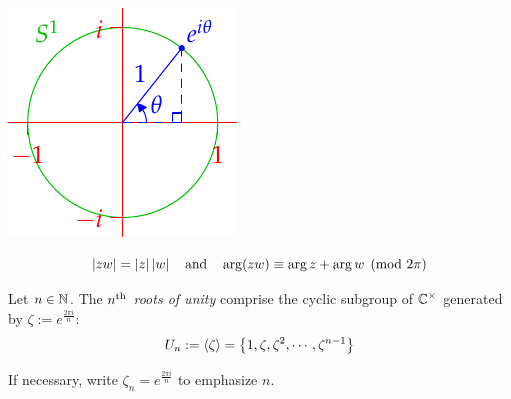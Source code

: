 \begin{aside}
\begin{minipage}[t]{0.29\textwidth}
\includegraphics[scale=0.9]{cyclic-circle}
\end{minipage}\par
\[\left| zw\right|=\left| z\right|\left| w\right|\quad \text{and}\quad \arg(zw)\equiv \arg z+\arg w \pmod{2\pi}\]
\end{aside}



\begin{defn}{}{}
Let $n\in\mathbb{N}$. The \emph{$n\textsuperscript{th}$ roots of unity\footnotemark} comprise the cyclic subgroup of $\mathbb{C}^\times$ generated by $\zeta:=e^{\frac{2\pi i}n}$:
\[U_n:=\left\langle \zeta\right\rangle=\bigl\{1,\zeta,\zeta^2,\cdots,\zeta^{n-1}\bigr\}\]
\end{defn}


\goodbreak

If necessary, write $\zeta_n=e^{\frac{2\pi i}n}$ to emphasize $n$.


